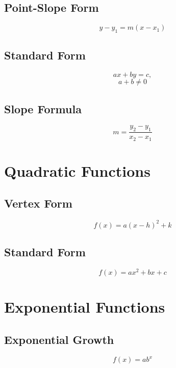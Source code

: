 \documentclass{book}
\begin{document}
\subsection{Point-Slope Form}
\begin{equation}
    y-y_1 = m(x - x_1)
\end{equation}
\subsection{Standard Form}
\begin{equation}
    ax+by = c,
\end{equation}
\begin{equation}
    a+b \neq 0 
\end{equation}
\subsection{Slope Formula}
\begin{equation}
    m = \frac{y_2 - y_1}{x_2 - x_1}
\end{equation}

\section{Quadratic Functions}
\subsection{Vertex Form}
\begin{equation}
    f(x) = a(x-h)^2 + k
\end{equation}

\subsection{Standard Form}
\begin{equation}
    f(x) = ax^2 + bx + c
\end{equation}

\section{Exponential Functions}
\subsection{Exponential Growth}
\begin{equation}
    f(x) = ab^x
\end{equation}
\end{document}
